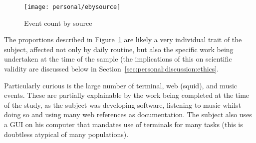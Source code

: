 

\begin{figure}[htb]
    \centering
    \texttt{[image: personal/ebysource]}
    \caption{Event count by source}
    \label{fig:personal:eventsbysource}
\end{figure}

The proportions described in Figure~\ref{fig:personal:eventsbysource} are likely a very individual trait of the subject, affected not only by daily routine, but also the specific work being undertaken at the time of the sample (the implications of this on scientific validity are discussed below in Section~\ref{sec:personal:discussion:ethics}.

Particularly curious is the large number of terminal, web (squid), and music events.  These are partially explainable by the work being completed at the time of the study, as the subject was developing software, listening to music whilst doing so and using many web references as documentation.  The subject also uses a GUI on his computer that mandates use of terminals for many tasks (this is doubtless atypical of many populations).



